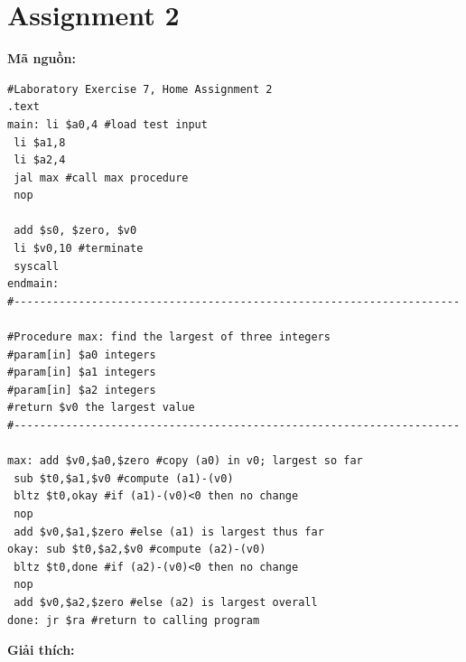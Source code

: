 \documentclass[12pt,a4paper,oneside]{article}
\begin{document}
\section*{Assignment 2}
\textbf{Mã nguồn:}
\begin{center}
\begin{lstlisting}
#Laboratory Exercise 7, Home Assignment 2
.text
main: li $a0,4 #load test input
 li $a1,8
 li $a2,4
 jal max #call max procedure
 nop 
 
 add $s0, $zero, $v0
 li $v0,10 #terminate
 syscall 
endmain: 
#---------------------------------------------------------------------

#Procedure max: find the largest of three integers
#param[in] $a0 integers
#param[in] $a1 integers
#param[in] $a2 integers
#return $v0 the largest value
#---------------------------------------------------------------------

max: add $v0,$a0,$zero #copy (a0) in v0; largest so far
 sub $t0,$a1,$v0 #compute (a1)-(v0)
 bltz $t0,okay #if (a1)-(v0)<0 then no change
 nop
 add $v0,$a1,$zero #else (a1) is largest thus far
okay: sub $t0,$a2,$v0 #compute (a2)-(v0)
 bltz $t0,done #if (a2)-(v0)<0 then no change
 nop
 add $v0,$a2,$zero #else (a2) is largest overall
done: jr $ra #return to calling program
\end{lstlisting}
\end{center}
\textbf{Giải thích:}
\end{document}
